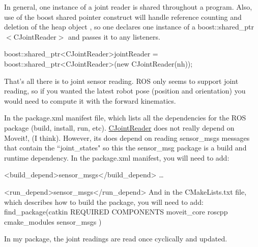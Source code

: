 In general, one instance of a joint reader is shared throughout a program. Also, use of the boost shared pointer construct will handle reference counting and deletion of the heap object , so one declares one instance of a boost\-::shared\-\_\-ptr$<$\-C\-Joint\-Reader$>$ and passes it to any listeners. \begin{DoxyVerb}boost::shared_ptr<CJointReader>jointReader = boost::shared_ptr<CJointReader>(new CJointReader(nh));
\end{DoxyVerb}


That’s all there is to joint sensor reading. R\-O\-S only seems to support joint reading, so if you wanted the latest robot pose (position and orientation) you would need to compute it with the forward kinematics.

In the package.\-xml manifest file, which lists all the dependencies for the R\-O\-S package (build, install, run, etc). \hyperlink{classCJointReader}{C\-Joint\-Reader} does not really depend on Moveit!, (I think). However, its does depend on reading sensor\-\_\-msgs messages that contain the “joint\-\_\-states" so this the sensor\-\_\-msg package is a build and runtime dependency. In the package.\-xml manifest, you will need to add\-:

\begin{DoxyVerb}<build_depend>sensor_msgs</build_depend>
…

<run_depend>sensor_msgs</run_depend>
And in the CMakeLists.txt file, which describes how to build the package, you will need to add:
find_package(catkin REQUIRED COMPONENTS
  moveit_core
  roscpp
  cmake_modules
  sensor_msgs
)
\end{DoxyVerb}


In my package, the joint readings are read once cyclically and updated. 
